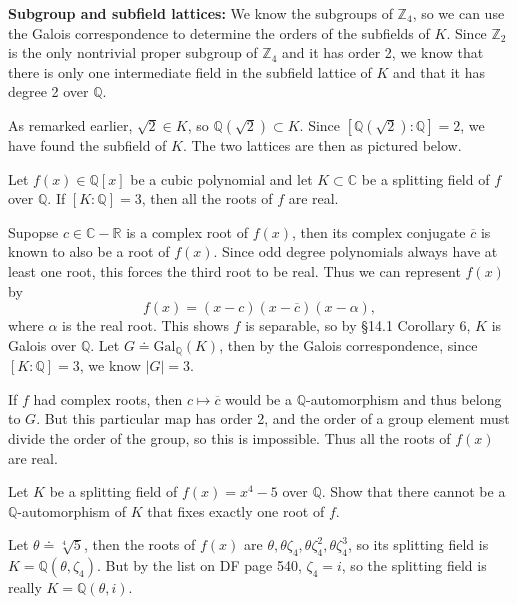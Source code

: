 \documentclass[twoside,10pt]{report}
\begin{document}
\textbf{Subgroup and subfield lattices:} We know the subgroups of $\mathbb{Z}_{4}$, so we can use the Galois correspondence to determine the orders of the subfields of $K$. Since $\mathbb{Z}_2$ is the only nontrivial proper subgroup of $\mathbb{Z}_{4}$ and it has order 2, we know that there is only one intermediate field in the subfield lattice of $K$ and that it has degree 2 over $\mathbb{Q}$.

As remarked earlier, $\sqrt{2} \in K$, so $\mathbb{Q}(\sqrt{2} )\subset K$. Since $[\mathbb{Q}(\sqrt{2} ):\mathbb{Q}]=2$, we have found the subfield of $K$. The two lattices are then as pictured below.

\begin{center}
\end{center}

\newpage
\begin{exer}[]
	Let $f(x) \in \mathbb{Q}[x]$ be a cubic polynomial and let $K\subset \mathbb{C}$ be a splitting field of $f$ over $\mathbb{Q}$. If $[K:\mathbb{Q}]=3$, then all the roots of $f$ are real.
\end{exer}
Supopse $c \in \mathbb{C}-\mathbb{R}$ is a complex root of $f(x)$, then its complex conjugate $\overline{c}$ is known to also be a root of $f(x)$. Since odd degree polynomials always have at least one root, this forces the third root to be real. Thus we can represent $f(x)$ by
\[
	f(x) = (x-c)(x-\overline{c})(x-\alpha),
\] where $\alpha$ is the real root. This shows $f$ is separable, so by \S 14.1 Corollary 6, $K$ is Galois over $\mathbb{Q}$. Let $G \doteq \text{Gal}_{\mathbb{Q}}(K)$, then by the Galois correspondence, since $[K:\mathbb{Q}]=3$, we know $|G|=3$.

If $f$ had complex roots, then $c \mapsto \overline{c}$ would be a $\mathbb{Q}$-automorphism and thus belong to $G$. But this particular map has order 2, and the order of a group element must divide the order of the group, so this is impossible. Thus all the roots of $f(x)$ are real.

\newpage
\begin{exer}[]
	Let $K$ be a splitting field of $f(x)=x^{4}-5$ over $\mathbb{Q}$. Show that there cannot be a $\mathbb{Q}$-automorphism of $K$ that fixes exactly one root of $f$.
\end{exer}
Let $\theta \doteq \sqrt[4]{5} $, then the roots of $f(x)$ are $\theta,\theta\zeta_4,\theta\zeta_4^{2},\theta\zeta_{4}^{3}$, so its splitting field is $K=\mathbb{Q}(\theta,\zeta_4)$. But by the list on DF page 540, $\zeta_4=i$, so the splitting field is really $K=\mathbb{Q}(\theta,i)$.
\end{document}
